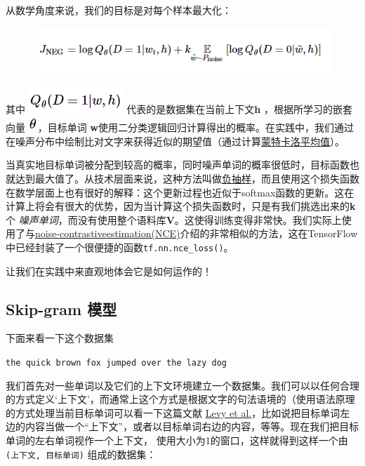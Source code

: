 从数学角度来说，我们的目标是对每个样本最大化：

\begin{figure}[htbp]
\centering
\includegraphics{../SOURCE/images/rw6.png}
\caption{}
\end{figure}

其中 \includegraphics{../SOURCE/images/rw7.png} 代表的是数据集在当前上下文\textbf{h} ，根据所学习的嵌套向量 \includegraphics{../SOURCE/images/theta.png}，目标单词 \textbf{w}使用二分类逻辑回归计算得出的概率。在实践中，我们通过在噪声分布中绘制比对文字来获得近似的期望值（通过计算\href{https://en.wikipedia.org/wiki/Monte_Carlo_integration}{蒙特卡洛平均值}）。

当真实地目标单词被分配到较高的概率，同时噪声单词的概率很低时，目标函数也就达到最大值了。从技术层面来说，这种方法叫做\href{http://papers.nips.cc/paper/5021-distributed-representations-of-words-and-phrases-and-their-compositionality.pdf}{负抽样}，而且使用这个损失函数在数学层面上也有很好的解释：这个更新过程也近似于softmax函数的更新。这在计算上将会有很大的优势，因为当计算这个损失函数时，只是有我们挑选出来的\textbf{k} 个 \emph{噪声单词}，而没有使用整个语料库\textbf{V}。这使得训练变得非常快。我们实际上使用了与\href{http://papers.nips.cc/paper/5165-learning-word-embeddings-efficiently-with-noise-contrastive-estimation.pdf}{noise-contrastiveestimation(NCE)}介绍的非常相似的方法，这在TensorFlow中已经封装了一个很便捷的函数\lstinline{tf.nn.nce_loss()}。

让我们在实践中来直观地体会它是如何运作的！

\subsection{Skip-gram 模型}\label{skip-gram_model}

下面来看一下这个数据集

\texttt{the\ quick\ brown\ fox\ jumped\ over\ the\ lazy\ dog}

我们首先对一些单词以及它们的上下文环境建立一个数据集。我们可以以任何合理的方式定义`上下文'，而通常上这个方式是根据文字的句法语境的（使用语法原理的方式处理当前目标单词可以看一下这篇文献
\href{https://levyomer.files.wordpress.com/2014/04/dependency-based-word-embeddings-acl-2014.pdf}{Levy et al.}，比如说把目标单词左边的内容当做一个“上下文”，或者以目标单词右边的内容，等等。现在我们把目标单词的左右单词视作一个上下文，
使用大小为1的窗口，这样就得到这样一个由\texttt{(上下文,\ 目标单词)}
组成的数据集：

